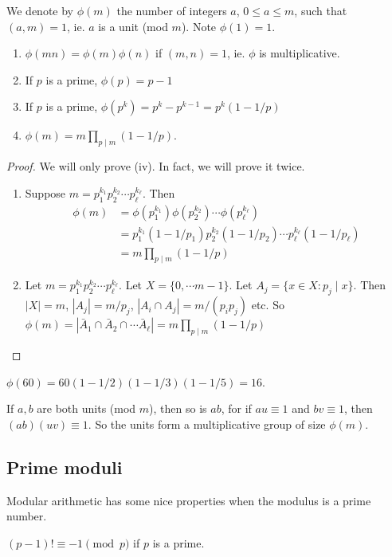 \documentclass[a4paper]{article}
\begin{document}
\begin{defi}
  We denote by $\phi(m)$ the number of integers $a$, $0\leq a\leq m$, such that $(a, m) = 1$, ie. $a$ is a unit (mod $m$). Note $\phi(1) = 1$.
\end{defi}

\begin{prop}\leavevmode
  \begin{enumerate}
    \item $\phi(mn) = \phi(m)\phi(n)$ if $(m, n) = 1$, ie. $\phi$ is multiplicative.
    \item If $p$ is a prime, $\phi(p) = p - 1$
    \item If $p$ is a prime, $\phi(p^k) = p^k - p^{k - 1} = p^k(1 - 1/p)$
    \item $\phi(m) = m\prod_{p \mid m}(1 - 1/p)$.
  \end{enumerate}
\end{prop}

\begin{proof}
  We will only prove (iv). In fact, we will prove it twice.
  \begin{enumerate}
    \item Suppose $m = p_1^{k_1}p_2^{k_2}\cdots p_\ell^{k_\ell}$. Then
      \begin{align*}
        \phi(m) &= \phi(p_1^{k_1})\phi(p_2^{k_2})\cdots \phi(p_\ell^{k_\ell})\\
        &= p_1^{k_1}(1-1/p_1)p_2^{k_2}(1 - 1/p_2)\cdots p_\ell^{k_\ell}(1 - 1/p_\ell)\\
        &= m\prod_{p \mid m}(1 - 1/p)
      \end{align*}
    \item Let $m = p_1^{k_1}p_2^{k_2}\cdots p_\ell^{k_\ell}$. Let $X = \{0, \cdots m - 1\}$. Let $A_j = \{x\in X: p_j\mid x\}$. Then $|X| = m$, $|A_j| = m/p_j$, $|A_i\cap A_j| = m/(p_ip_j)$ etc. So $\phi(m) = |\bar A_1\cap \bar A_2\cap \cdots \bar A_\ell| = m\prod_{p \mid m}(1 - 1/p)$
  \end{enumerate}
\end{proof}

\begin{eg}
  $\phi(60) = 60(1 - 1/2)(1 - 1/3)(1 - 1/5) = 16$.
\end{eg}

If $a, b$ are both units (mod $m$), then so is $ab$, for if $au \equiv 1$ and $bv \equiv 1$, then $(ab)(uv)\equiv 1$. So the units form a multiplicative group of size $\phi(m)$.

\subsection{Prime moduli}
Modular arithmetic has some nice properties when the modulus is a prime number.
\begin{thm}
  $(p - 1)! \equiv -1\pmod p$ if $p$ is a prime.
\end{thm}
\end{document}
